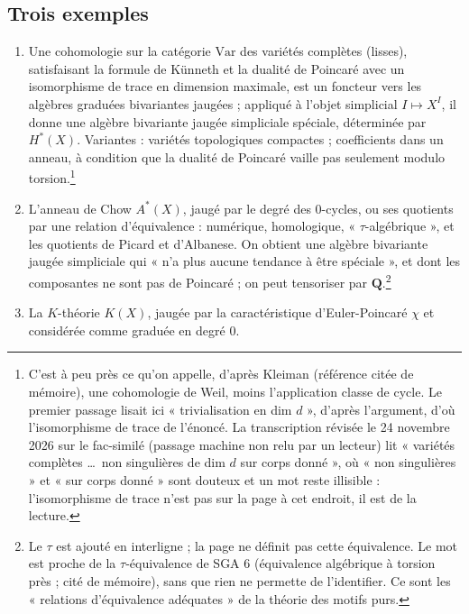 \documentclass[11pt,a4paper]{article}
\begin{document}
\subsection*{Trois exemples}

\begin{enumerate}
  \item Une cohomologie sur la catégorie $\mathrm{Var}$ des variétés complètes
  (lisses), satisfaisant la formule de Künneth et la dualité de Poincaré avec
  un isomorphisme de trace en dimension maximale, est un foncteur vers les
  algèbres graduées bivariantes jaugées ; appliqué à l'objet simplicial
  $I \mapsto X^{I}$, il donne une algèbre bivariante jaugée simpliciale
  spéciale, déterminée par $H^{*}(X)$. Variantes : variétés topologiques
  compactes ; coefficients dans un anneau, à condition que la dualité de
  Poincaré vaille pas seulement modulo torsion.\footnote{C'est à peu près ce
  qu'on appelle, d'après Kleiman (référence citée de mémoire), une cohomologie
de Weil, moins
  l'application classe de cycle. Le premier passage lisait ici
  « trivialisation en dim $d$ », d'après l'argument, d'où l'isomorphisme de
  trace de l'énoncé. La transcription révisée le 24 novembre 2026 sur le
  fac-similé (passage machine non relu par un lecteur) lit « variétés complètes
  \ldots\ non singulières de dim $d$ sur corps donné », où « non singulières »
  et « sur corps donné » sont douteux et un mot reste illisible :
  l'isomorphisme de trace n'est pas sur la page à cet endroit, il est de la
  lecture.}
  \item L'anneau de Chow $A^{*}(X)$, jaugé par le degré des $0$-cycles, ou ses
  quotients par une relation d'équivalence : numérique, homologique,
  « $\tau$-algébrique », et les quotients de Picard et d'Albanese. On obtient
  une algèbre bivariante jaugée simpliciale qui « n'a plus aucune tendance à
  être spéciale », et dont les composantes ne sont pas de Poincaré ; on peut
  tensoriser par $\mathbf{Q}$.\footnote{Le $\tau$ est ajouté en interligne ;
  la page ne définit pas cette équivalence. Le mot est proche de la
  $\tau$-équivalence de SGA 6 (équivalence algébrique à torsion près ; cité
de mémoire), sans que
  rien ne permette de l'identifier. Ce sont les « relations d'équivalence
  adéquates » de la théorie des motifs purs.}
  \item La $K$-théorie $K(X)$, jaugée par la caractéristique d'Euler-Poincaré
  $\chi$ et considérée comme graduée en degré $0$.
\end{enumerate}
\end{document}
